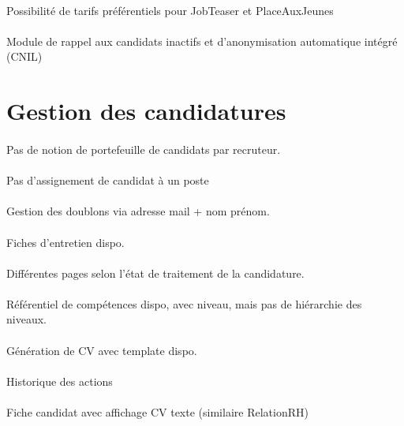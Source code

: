 \paragraph{} Possibilité de tarifs préférentiels pour JobTeaser et PlaceAuxJeunes
\paragraph{} Module de rappel aux candidats inactifs et d'anonymisation automatique intégré (CNIL)


\section{Gestion des candidatures}
\paragraph{} Pas de notion de portefeuille de candidats par recruteur.
\paragraph{} Pas d'assignement de candidat à un poste
\paragraph{} Gestion des doublons via adresse mail + nom prénom.
\paragraph{} Fiches d'entretien dispo.
\paragraph{} Différentes pages selon l'état de traitement de la candidature.
\paragraph{} Référentiel de compétences dispo, avec niveau, mais pas de hiérarchie des niveaux.
\paragraph{} Génération de CV avec template dispo.
\paragraph{} Historique des actions
\paragraph{} Fiche candidat avec affichage CV texte (similaire RelationRH)



